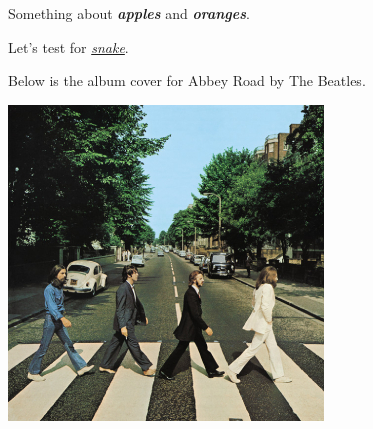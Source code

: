 \documentclass{article}
\newcommand\kw[1]{\textbf{\itshape #1}}
\newcommand\saap[1]{\emph{\underline{#1}}}
\begin{document}
Something about \kw{apples} and \kw{oranges}.

Let's test for \saap{snake}.

Below is the album cover for Abbey Road by The Beatles.

\lipsum[1] %
\begin{center}
	\includegraphics{./album_cover.jpg}
\end{center}
\end{document}
